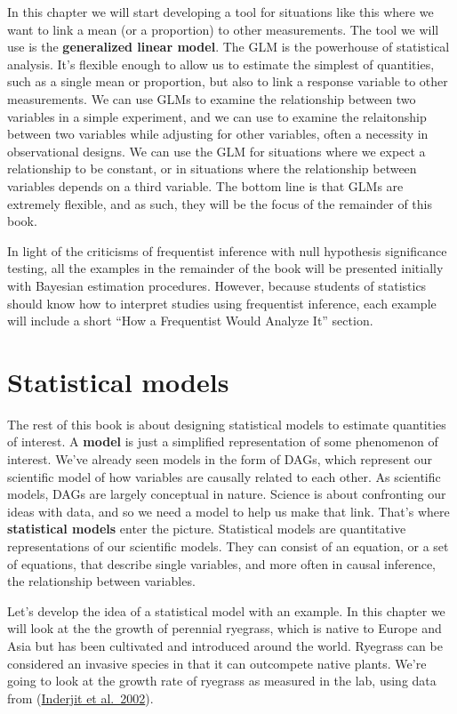 \documentclass[
]{book}
\begin{document}
In this chapter we will start developing a tool for situations like this where we want to link a mean (or a proportion) to other measurements. The tool we will use is the \textbf{generalized linear model}. The GLM is the powerhouse of statistical analysis. It's flexible enough to allow us to estimate the simplest of quantities, such as a single mean or proportion, but also to link a response variable to other measurements. We can use GLMs to examine the relationship between two variables in a simple experiment, and we can use to examine the relaitonship between two variables while adjusting for other variables, often a necessity in observational designs. We can use the GLM for situations where we expect a relationship to be constant, or in situations where the relationship between variables depends on a third variable. The bottom line is that GLMs are extremely flexible, and as such, they will be the focus of the remainder of this book.

In light of the criticisms of frequentist inference with null hypothesis significance testing, all the examples in the remainder of the book will be presented initially with Bayesian estimation procedures. However, because students of statistics should know how to interpret studies using frequentist inference, each example will include a short ``How a Frequentist Would Analyze It'' section.

\section{Statistical models}\label{statistical-models}

The rest of this book is about designing statistical models to estimate quantities of interest. A \textbf{model} is just a simplified representation of some phenomenon of interest. We've already seen models in the form of DAGs, which represent our scientific model of how variables are causally related to each other. As scientific models, DAGs are largely conceptual in nature. Science is about confronting our ideas with data, and so we need a model to help us make that link. That's where \textbf{statistical models} enter the picture. Statistical models are quantitative representations of our scientific models. They can consist of an equation, or a set of equations, that describe single variables, and more often in causal inference, the relationship between variables.

Let's develop the idea of a statistical model with an example. In this chapter we will look at the the growth of perennial ryegrass, which is native to Europe and Asia but has been cultivated and introduced around the world. Ryegrass can be considered an invasive species in that it can outcompete native plants. We're going to look at the growth rate of ryegrass as measured in the lab, using data from (\href{https://doi.org/10.1034/j.1399-3054.2002.1140312.x}{Inderjit et al.~2002}).
\end{document}
